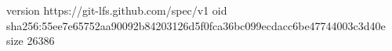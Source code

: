version https://git-lfs.github.com/spec/v1
oid sha256:55ee7e65752aa90092b84203126d5f0fca36bc099ecdacc6be47744003c3d40e
size 26386
